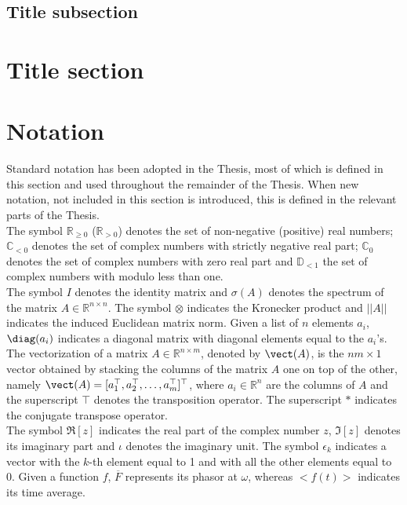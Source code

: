 \kant[1-4]

\subsection{Title subsection}

\kant[1-3]


\section{Title section}

\kant[1-5]

\section{Notation}

Standard notation has been adopted in the Thesis, most of which is defined in this section and used throughout the remainder of the Thesis. When new notation, not included in this section is introduced, this is defined in the relevant parts of the Thesis.\smallskip\\
\indent The symbol $\mathbb{R}_{\ge0}$ ($\mathbb{R}_{>0}$) denotes the set of non-negative (positive) real numbers; $\mathbb{C}_{<0}$ denotes the set of complex numbers with strictly negative real part; $\mathbb{C}_{0}$ denotes the set of complex numbers with zero real part and $\mathbb{D}_{<1}$ the set of complex numbers with modulo less than one.\smallskip\\
\indent The symbol $I$ denotes the identity matrix and $\sigma(A)$ denotes the spectrum of the matrix $A\in\mathbb{R}^{n\times n}$. The symbol $\otimes$ indicates the Kronecker product and $||A||$ indicates the induced Euclidean matrix norm. Given a list of $n$ elements $a_i$, $\diag(a_i)$ indicates a diagonal matrix with diagonal elements equal to the $a_i$'s. The vectorization of a matrix $A\in\mathbb{R}^{n\times m}$, denoted by $\vect(A)$, is the $nm \times 1$ vector obtained by stacking the columns of the matrix $A$ one on top of the other, namely $\vect(A)=[a_1^{\top},a_2^{\top},\dots,a_m^{\top}]^{\top}$, where $a_i\in\mathbb{R}^n$ are the columns of $A$ and the superscript $\top$ denotes the transposition operator. The superscript $*$ indicates the conjugate transpose operator.\smallskip\\
\indent The symbol $\Re[z]$ indicates the real part of the complex number $z$, $\Im[z]$ denotes its imaginary part and $\iota$ denotes the imaginary unit. The symbol $\epsilon_k$ indicates a vector with the $k$-th element equal to 1 and with all the other elements equal to 0. Given a function $f$, $\overline{F}$ represents its phasor at $\omega$, whereas $<\!f(t)\!>$ indicates its time average.\smallskip\\

